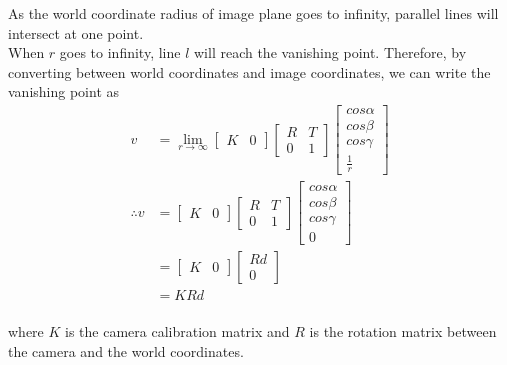 \documentclass[letterpaper]{article}
\begin{document}
As the world coordinate radius of image plane goes to infinity, parallel lines will intersect at one point.\\
When $r$ goes to infinity, line $l$ will reach the vanishing point. Therefore, by converting between world coordinates and image coordinates, we can write the vanishing point as
\begin{align*}
v&=\lim_{r\rightarrow \infty }\begin{bmatrix}
K & 0
\end{bmatrix}\begin{bmatrix}
R & T \\
0 & 1
\end{bmatrix}
\begin{bmatrix}
cos\alpha \\
cos\beta\\
cos\gamma\\
\frac{1}{r}
\end{bmatrix}\\
\therefore v&=\begin{bmatrix}
K & 0
\end{bmatrix}\begin{bmatrix}
R & T \\
0 & 1
\end{bmatrix}
\begin{bmatrix}
cos\alpha \\
cos\beta\\
cos\gamma\\
0
\end{bmatrix}\\
&=\begin{bmatrix}
K & 0
\end{bmatrix}\begin{bmatrix}
Rd \\
0
\end{bmatrix}\\
&=KRd
\end{align*}\\
where $K$ is the camera calibration matrix and $R$ is the rotation matrix between the camera and the world coordinates.
\end{document}
